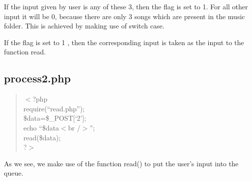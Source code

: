 If the input given by user is any of these 3, then the flag is set to 1. For all other input it will be 0, because there are only 3 songs which are present in the music folder. This is achieved by making use of switch case.

If the flag is set to 1 , then the corresponding input is taken as the input to the function read.  

\subsection*{process2.php}
\begin{quote}
$<$?php\\
require(``read.php'');\\
\$data=\$\_POST[`2'];\\
echo ``\$data$<$br /$>$'';\\
read(\$data);\\
?$>$\\
\end{quote}


As we see, we make use of the function read() to put the user’s input into the queue.

